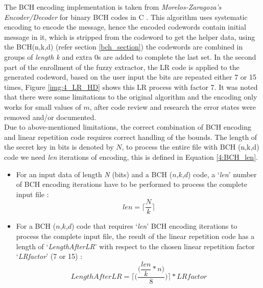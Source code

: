 The BCH encoding implementation is taken from \emph{Morelos-Zaragoza's Encoder/Decoder} for binary BCH codes in C \cite{69}. This algorithm uses systematic encoding to encode the message, hence the encoded codewords contain initial message in it, which is stripped from the codeword to get the helper data, using the BCH(n,k,d) (refer section \ref{bch_section}) the codewords are combined in groups of \emph{length k} and extra 0s are added to complete the last set. In the
second part of the enrollment of the fuzzy extractor, the LR code is applied to the generated codeword, based on the user input the bits are repeated either 7 or 15 times, Figure \ref{img:4_LR_HD} shows this LR process with factor 7. It was noted that there were some limitations to the original algorithm and the encoding only works for small values of $m$, after code review and research the error states were removed and/or documented.\\

	Due to above-mentioned limitations, the correct combination of BCH encoding and linear repetition code requires correct handling of the bounds. The length of the secret key in bits is denoted by $N$, to process the entire file with BCH (n,k,d) code we need \emph{len} iterations of encoding, this is defined in Equation \ref{4:BCH_len}.

	\begin{itemize}
		\item For an input data of length \emph{N} (bits) and a BCH ($n$,$k$,$d$) code, a ‘\emph{len}’ number of BCH encoding iterations have to be performed to process the complete input file \cite{71}:
	\begin{equation}
		len =\Bigg\lceil\dfrac{N}{k}\Bigg\rceil
		\label{4:BCH_len}
	\end{equation}

	\item For a BCH ($n$,$k$,$d$) code that requires ‘\emph{len}’ BCH encoding iterations to process the complete input file, the result of the linear repetition code has a length of ‘\emph{LengthAfterLR}’ with respect to the chosen linear repetition factor ‘\emph{LRfactor}’ (7 or 15) \cite{71}:
	\begin{equation}
		LengthAfterLR = \Bigg\lceil\Bigg(\dfrac{\Bigg(\dfrac{len}{k} * n\Bigg)}{8}\Bigg)\Bigg\rceil * LRfactor
	\label{4:BCH_LR_len}
	\end{equation}
	\end{itemize}

